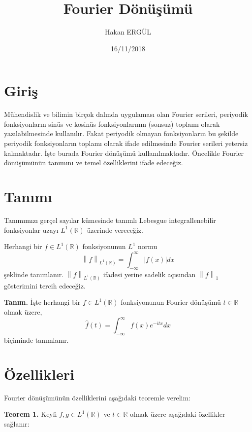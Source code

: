 \documentclass[a4paper, 9pt]{article}
\title{Fourier Dönüşümü}
\author{Hakan ERGÜL}
\date{16/11/2018}
\begin{document}
\maketitle

\section{Giriş}

Mühendislik ve bilimin birçok dalında uygulaması olan Fourier serileri, periyodik fonksiyonların sinüs ve kosinüs fonksiyonlarının (sonsuz) toplamı olarak yazılabilmesinde kullanılır. Fakat periyodik olmayan fonksiyonların bu şekilde periyodik fonksiyonların toplamı olarak ifade edilmesinde Fourier serileri yetersiz kalmaktadır. İşte burada Fourier dönüşümü kullanılmaktadır. Öncelikle Fourier dönüşümünün tanımını ve temel özelliklerini ifade edeceğiz.

\section{Tanımı}

Tanımımızı gerçel sayılar kümesinde tanımlı Lebesgue integrallenebilir fonksiyonlar uzayı $L^1(\mathbb{R})$ üzerinde vereceğiz.

Herhangi bir $f \in L^1(\mathbb{R})$ fonksiyonunun $L^1$ normu
\[\left \| f  \right \|_{ L^1(\mathbb{R})} = \int_{-\infty }^{\infty }\left | f(x) \right |dx\]
şeklinde tanımlanır. $ \left \| f  \right \|_{ L^1(\mathbb{R})}$  ifadesi yerine sadelik açısından $\left \| f  \right \|_1$ gösterimini tercih edeceğiz.

\textbf{Tanım.} İşte herhangi bir $f \in L^1(\mathbb{R})$ fonksiyonunun Fourier dönüşümü $t\in \mathbb{R}$ olmak üzere,
\[  \widehat{f}(t)=\int_{-\infty }^{\infty }f(x)e^{-itx}dx  \]
biçiminde tanımlanır.

\section{Özellikleri}

	Fourier dönüşümünün özelliklerini aşağıdaki teoremle verelim:

\textbf{Teorem 1.} Keyfi $f, g \in L^1(\mathbb{R})$ ve $t\in \mathbb{R}$ olmak üzere aşağıdaki özellikler sağlanır:
\end{document}
